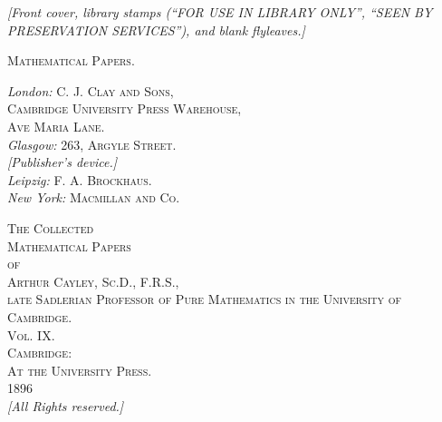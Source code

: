 \documentclass[11pt]{article}
\begin{document}

\thispagestyle{empty}
\vspace*{\fill}
\begin{center}
\textit{[Front cover, library stamps (``FOR USE IN LIBRARY ONLY'', ``SEEN BY PRESERVATION SERVICES''), and blank flyleaves.]}
\end{center}
\vspace*{\fill}
\newpage

\thispagestyle{empty}
\vspace*{0.30\textheight}
\begin{center}
{\Large\scshape Mathematical Papers.}
\end{center}
\vspace*{\fill}
\newpage

\thispagestyle{empty}
\vspace*{0.30\textheight}
\begin{center}
\textsl{London:} \textsc{C. J. Clay and Sons,}\\
\textsc{Cambridge University Press Warehouse,}\\
\textsc{Ave Maria Lane.}\\[2pt]
\textsl{Glasgow:} 263, \textsc{Argyle Street.}\\[10pt]
\textit{[Publisher's device.]}\\[10pt]
\textsl{Leipzig:} \textsc{F. A. Brockhaus.}\\
\textsl{New York:} \textsc{Macmillan and Co.}
\end{center}
\vspace*{\fill}
\newpage

\thispagestyle{empty}
\begin{center}
\vspace*{0.06\textheight}
{\LARGE\scshape The Collected}\\[1.2em]
{\Huge\scshape Mathematical Papers}\\[1.0em]
{\large\scshape of}\\[1.0em]
{\Large\scshape Arthur Cayley, Sc.D., F.R.S.,}\\[0.4em]
{\footnotesize\scshape late Sadlerian Professor of Pure Mathematics in the University of Cambridge.}\\[3.2em]
{\Large\scshape Vol. IX.}\\[3.2em]
{\Large\scshape Cambridge:}\\
{\large\scshape At the University Press.}\\[0.3em]
{\large 1896}\\[1.4em]
{\footnotesize \textit{[All Rights reserved.]}}
\end{center}
\vspace*{\fill}
\newpage
\end{document}
